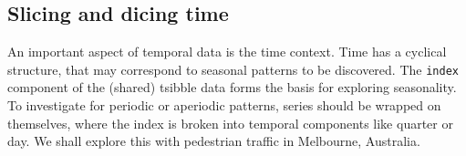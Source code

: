 \hypertarget{slicing-and-dicing-time}{%
\subsection{Slicing and dicing time}\label{slicing-and-dicing-time}}

An important aspect of temporal data is the time context. Time has a cyclical structure, that may correspond to seasonal patterns to be discovered. The \texttt{index} component of the (shared) tsibble data forms the basis for exploring seasonality. To investigate for periodic or aperiodic patterns, series should be wrapped on themselves, where the index is broken into temporal components like quarter or day. We shall explore this with pedestrian traffic in Melbourne, Australia.

\begin{figure}

{\centering {}\newline{}\newline{}

}
\end{figure}
